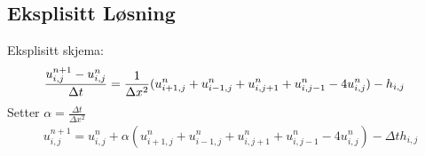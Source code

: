 \subsection{Eksplisitt Løsning}
Eksplisitt skjema:
\begin{align}
\frac{u^{n+1}_{i,j} - u^n_{i,j}}{\Delta t} &= \frac{1}{\Delta x^2}
                                               (u^n_{i+1,j} +
                                               u^n_{i-1,j} +
                                               u^n_{i,j+1} +
                                               u^n_{i,j-1} -4 
                                               u^n_{i,j}) - h_{i,j} \newline
\end{align}
Setter $\alpha =\frac{\Delta t}{\Delta x^2}$
\begin{align}
  u^{n+1}_{i,j} =  u^n_{i,j} + \alpha (u^n_{i+1,j} + u^n_{i-1,j} + u^n_{i,j+1} + u^n_{i,j-1} -4u^n_{i,j}) - \Delta th_{i,j}
\end{align}
